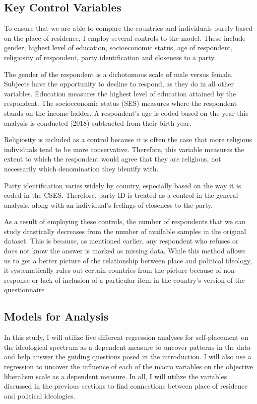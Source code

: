 \documentclass[12pt, titlepage]{article}
\begin{document}
\subsection{Key Control Variables}

To ensure that we are able to compare the countries and individuals purely based on the place of residence, I employ several controls to the model. These include gender, highest level of education, socioeconomic status, age of respondent, religiosity of respondent, party identification and closeness to a party. 

The gender of the respondent is a dichotomous scale of male versus female. Subjects have the opportunity to decline to respond, as they do in all other variables. Education measures the highest level of education attained by the respondent. The socioeconomic status (SES) measures where the respondent stands on the income ladder. A respondent's age is coded based on the year this analysis is conducted (2018) subtracted from their birth year. 

Religiosity is included as a control because it is often the case that more religious individuals tend to be more conservative. Therefore, this variable measures the extent to which the respondent would agree that they are religious, not necessarily which denomination they identify with. 

Party identification varies widely by country, especially based on the way it is coded in the CSES. Therefore, party ID is treated as a control in the general analysis, along with an individual's feelings of closeness to the party. 

As a result of employing these controls, the number of respondents that we can study drastically decreases from the number of available samples in the original dataset. This is because, as mentioned earlier, any respondent who refuses or does not know the answer is marked as missing data. While this method allows us to get a better picture of the relationship between place and political ideology, it systematically rules out certain countries from the picture because of non-response or lack of inclusion of a particular item in the country's version of the questionnaire 

\subsection{Models for Analysis}

In this study, I will utilize five different regression analyses for self-placement on the ideological spectrum as a dependent measure to uncover patterns in the data and help answer the guiding questions posed in the introduction. I will also use a regression to uncover the influence of each of the macro variables on the objective liberalism scale as a dependent measure. In all, I will utilize the variables discussed in the previous sections to find connections between place of residence and political ideologies.
\end{document}
